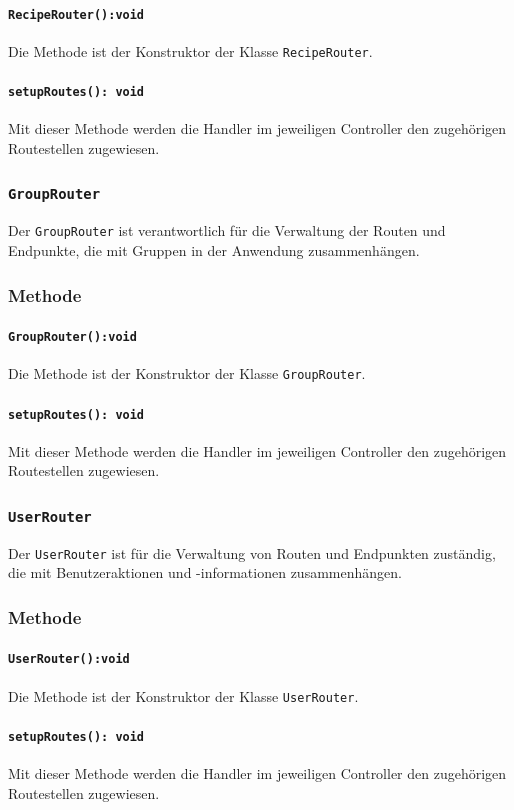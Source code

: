 \documentclass{entwurfsheft}
\begin{document}
\paragraph{\texttt{RecipeRouter():void}}
Die Methode ist der Konstruktor der Klasse \texttt{RecipeRouter}.
\paragraph{\texttt{setupRoutes(): void}}
Mit dieser Methode werden die Handler im jeweiligen Controller den zugehörigen Routestellen zugewiesen.

\subsubsection{\texttt{GroupRouter}}\label{sec:GroupRouter}
Der \texttt{GroupRouter} ist verantwortlich für die Verwaltung der Routen und Endpunkte, die mit Gruppen in der Anwendung zusammenhängen.
\subsubsection*{Methode}
\paragraph{\texttt{GroupRouter():void}}
Die Methode ist der Konstruktor der Klasse \texttt{GroupRouter}.
\paragraph{\texttt{setupRoutes(): void}}
Mit dieser Methode werden die Handler im jeweiligen Controller den zugehörigen Routestellen zugewiesen.

\subsubsection{\texttt{UserRouter}}\label{sec:UserRouter}
Der \texttt{UserRouter} ist für die Verwaltung von Routen und Endpunkten zuständig, die mit Benutzeraktionen und -informationen zusammenhängen.
\subsubsection*{Methode}
\paragraph{\texttt{UserRouter():void}}
Die Methode ist der Konstruktor der Klasse \texttt{UserRouter}.
\paragraph{\texttt{setupRoutes(): void}}
Mit dieser Methode werden die Handler im jeweiligen Controller den zugehörigen Routestellen zugewiesen.
\end{document}
